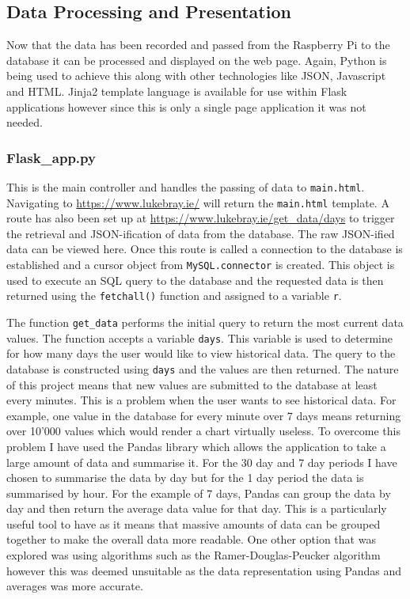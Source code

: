 \documentclass[10pt,a4paper]{article}
\begin{document}
\subsection{Data Processing and Presentation}
Now that the data has been recorded and passed from the Raspberry Pi to the database it can be processed and displayed on the web page. Again, Python is being used to achieve this along with other technologies like JSON, Javascript and HTML. Jinja2 template language is available for use within Flask applications however since this is only a single page application it was not needed. 

\subsubsection{Flask\_app.py}
This is the main controller and handles the passing of data to \texttt{main.html}. Navigating to \url{https://www.lukebray.ie/} will return the \texttt{main.html} template. A route has also been set up at \url{https://www.lukebray.ie/get_data/days} to trigger the retrieval and JSON-ification of data from the database. The raw JSON-ified data can be viewed here. Once this route is called a connection to the database is established and a cursor object from \texttt{MySQL.connector} is created. This object is used to execute an SQL query to the database and the requested data is then returned using the \texttt{fetchall()} function and assigned to a variable \texttt{r}. 

The function \texttt{get\_data} performs the initial query to return the most current data values. The function accepts a variable \texttt{days}. This variable is used to determine for how many days the user would like to view historical data. The query to the database is constructed using \texttt{days} and the values are then returned. The nature of this project means that new values are submitted to the database at least every minutes. This is a problem when the user wants to see historical data. For example, one value in the database for every minute over 7 days means returning over 10'000 values which would render a chart virtually useless. To overcome this problem I have used the Pandas\cite{pandas} library which allows the application to take a large amount of data and summarise it. For the 30 day and 7 day periods I have chosen to summarise the data by day but for the 1 day period the data is summarised by hour. For the example of 7 days, Pandas can group the data by day and then return the average data value for that day. This is a particularly useful tool to have as it means that massive amounts of data can be grouped together to make the overall data more readable. One other option that was explored was using algorithms such as the Ramer-Douglas-Peucker\cite{douglaspeucker} algorithm however this was deemed unsuitable as the data representation using Pandas and averages was more accurate. 
\end{document}
